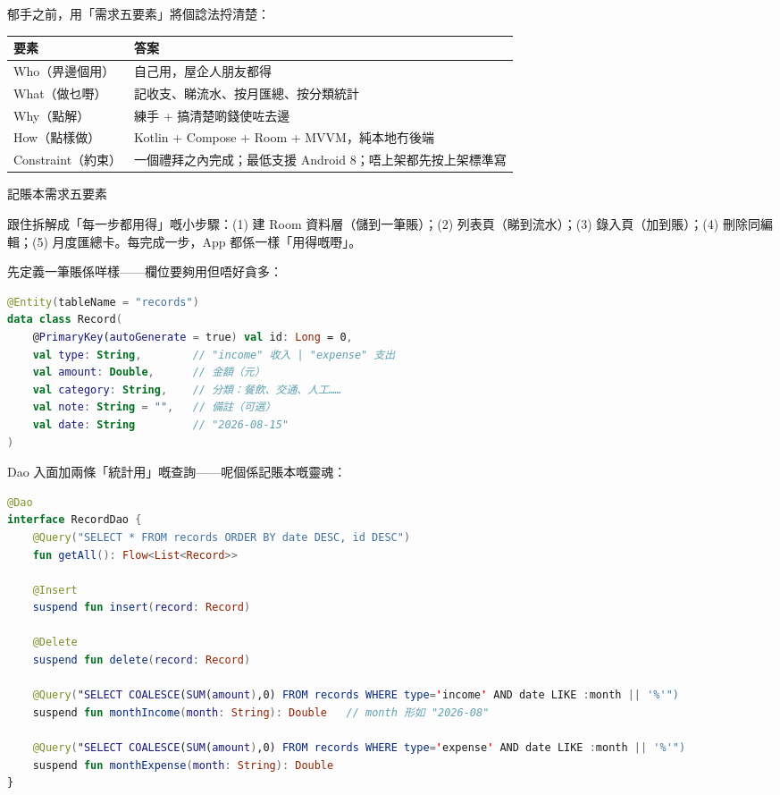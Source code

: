 


郁手之前，用「需求五要素」將個諗法捋清楚：

\begin{center}
\begin{tabularx}{\linewidth}{|X|X|}
\hline
\textbf{要素} & \textbf{答案} \tabularnewline
\hline
Who（畀邊個用） & 自己用，屋企人朋友都得 \tabularnewline
What（做乜嘢） & 記收支、睇流水、按月匯總、按分類統計 \tabularnewline
Why（點解） & 練手 + 搞清楚啲錢使咗去邊 \tabularnewline
How（點樣做） & Kotlin + Compose + Room + MVVM，純本地冇後端 \tabularnewline
Constraint（約束） & 一個禮拜之內完成；最低支援 Android 8；唔上架都先按上架標準寫 \tabularnewline
\hline
\end{tabularx}
\end{center}

\begin{center}\small\color{gray}記賬本需求五要素\end{center}

跟住拆解成「每一步都用得」嘅小步驟：(1) 建 Room 資料層（儲到一筆賬）；(2) 列表頁（睇到流水）；(3) 錄入頁（加到賬）；(4) 刪除同編輯；(5) 月度匯總卡。每完成一步，App 都係一樣「用得嘅嘢」。


先定義一筆賬係咩樣——欄位要夠用但唔好貪多：

\begin{lstlisting}[language=Kotlin]
@Entity(tableName = "records")
data class Record(
    @PrimaryKey(autoGenerate = true) val id: Long = 0,
    val type: String,        // "income" 收入 | "expense" 支出
    val amount: Double,      // 金額（元）
    val category: String,    // 分類：餐飲、交通、人工……
    val note: String = "",   // 備註（可選）
    val date: String         // "2026-08-15"
)
\end{lstlisting}

Dao 入面加兩條「統計用」嘅查詢——呢個係記賬本嘅靈魂：

\begin{lstlisting}[language=Kotlin]
@Dao
interface RecordDao {
    @Query("SELECT * FROM records ORDER BY date DESC, id DESC")
    fun getAll(): Flow<List<Record>>

    @Insert
    suspend fun insert(record: Record)

    @Delete
    suspend fun delete(record: Record)

    @Query("SELECT COALESCE(SUM(amount),0) FROM records WHERE type='income' AND date LIKE :month || '%'")
    suspend fun monthIncome(month: String): Double   // month 形如 "2026-08"

    @Query("SELECT COALESCE(SUM(amount),0) FROM records WHERE type='expense' AND date LIKE :month || '%'")
    suspend fun monthExpense(month: String): Double
}
\end{lstlisting}

